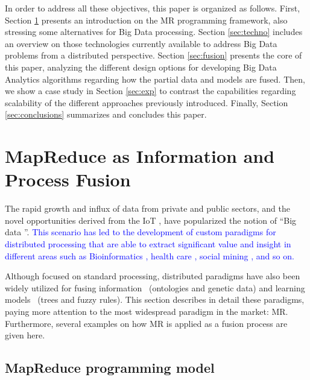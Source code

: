\documentclass[3p,review]{elsarticle}
\begin{document}
	In order to address all these objectives, this paper is organized as follows. First, Section \ref{sec:mr} presents an introduction on the MR programming framework, also stressing some alternatives for Big Data processing. Section \ref{sec:techno} includes an overview on those technologies currently available to address Big Data problems from a distributed perspective. Section \ref{sec:fusion} presents the core of this paper, analyzing the different design options for developing Big Data Analytics algorithms regarding how the partial data and models are fused. Then, we show a case study in Section \ref{sec:exp} to contrast the capabilities regarding scalability of the different approaches previously introduced. Finally, Section \ref{sec:conclusions} summarizes and concludes this paper.
	
	\section{MapReduce as Information and Process Fusion}\label{sec:mr}
	
	The rapid growth and influx of data from private and public sectors, and the novel opportunities derived from the IoT \cite{TsaiLCY14-IoT}, have popularized the notion of ``Big data \cite{Fer14,Chen14,wu14}''. \textcolor{blue}{This scenario has led to the development of custom paradigms for distributed processing that are able to extract significant value and insight in different areas such as Bioinformatics \cite{Galpert-Rio15-BDapp}, health care \cite{ChenHHWW17}, social mining \cite{BalazsV16,SunLC17}, and so on.}
	
	Although focused on standard processing, distributed paradigms have also been widely utilized for fusing information~\cite{zhang14b, meng15} (ontologies and genetic data) and learning models~\cite{rio14b, rio15b} (trees and fuzzy rules). This section describes in detail these paradigms, paying more attention to the most widespread paradigm in the market: MR. Furthermore, several examples on how MR is applied as a fusion process are given here.
	
	\subsection{MapReduce programming model}\label{subsec:mr}
	
	
\end{document}
